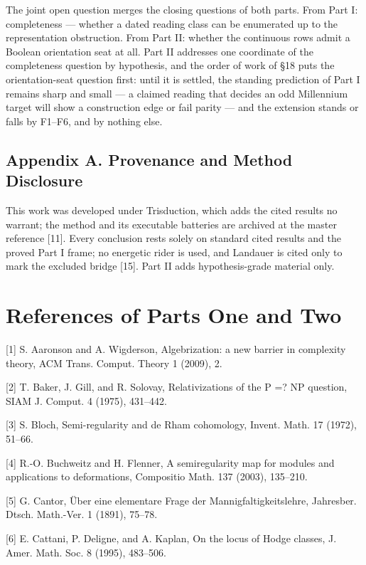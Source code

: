 \documentclass[10pt,twocolumn]{article}
\begin{document}
The joint open question merges the closing questions of both parts. From
Part I: completeness --- whether a dated reading class can be enumerated
up to the representation obstruction. From Part II: whether the
continuous rows admit a Boolean orientation seat at all. Part II
addresses one coordinate of the completeness question by hypothesis, and
the order of work of §18 puts the orientation-seat question first: until
it is settled, the standing prediction of Part I remains sharp and small
--- a claimed reading that decides an odd Millennium target will show a
construction edge or fail parity --- and the extension stands or falls
by F1--F6, and by nothing else.

\subsection{Appendix A. Provenance and Method
Disclosure}\label{appendix-a.-provenance-and-method-disclosure}

This work was developed under Trisduction, which adds the cited results
no warrant; the method and its executable batteries are archived at the
master reference {[}11{]}. Every conclusion rests solely on standard
cited results and the proved Part I frame; no energetic rider is used,
and Landauer is cited only to mark the excluded bridge {[}15{]}. Part II
adds hypothesis-grade material only.

\section{References of Parts One and
Two}\label{references-of-parts-one-and-two}

{[}1{]} S. Aaronson and A. Wigderson, Algebrization: a new barrier in
complexity theory, ACM Trans. Comput. Theory 1 (2009), 2.

{[}2{]} T. Baker, J. Gill, and R. Solovay, Relativizations of the P =?
NP question, SIAM J. Comput. 4 (1975), 431--442.

{[}3{]} S. Bloch, Semi-regularity and de Rham cohomology, Invent. Math.
17 (1972), 51--66.

{[}4{]} R.-O. Buchweitz and H. Flenner, A semiregularity map for modules
and applications to deformations, Compositio Math. 137 (2003), 135--210.

{[}5{]} G. Cantor, Über eine elementare Frage der
Mannigfaltigkeitslehre, Jahresber. Dtsch. Math.-Ver. 1 (1891), 75--78.

{[}6{]} E. Cattani, P. Deligne, and A. Kaplan, On the locus of Hodge
classes, J. Amer. Math. Soc. 8 (1995), 483--506.
\end{document}
